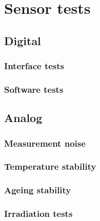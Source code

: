 \chapter{Sensor tests}

\section{Digital}
\subsection{Interface tests}
\subsection{Software tests}

\section{Analog}
\subsection{Measurement noise}
\subsection{Temperature stability}
\subsection{Ageing stability}
\subsection{Irradiation tests}
